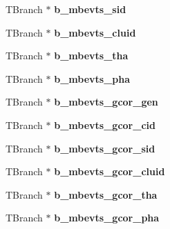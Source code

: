 \begin{DoxyCompactItemize}
\item 
\hypertarget{classg__clx_a80f356c60fe1eea5e82fcba16b4d482b}{T\-Branch $\ast$ {\bfseries b\-\_\-mbevts\-\_\-sid}}\label{classg__clx_a80f356c60fe1eea5e82fcba16b4d482b}

\item 
\hypertarget{classg__clx_ae91752a1092e7b3ec6191515378fbd63}{T\-Branch $\ast$ {\bfseries b\-\_\-mbevts\-\_\-cluid}}\label{classg__clx_ae91752a1092e7b3ec6191515378fbd63}

\item 
\hypertarget{classg__clx_a7c4dd347f0cf1856c3aaca6c77a3280a}{T\-Branch $\ast$ {\bfseries b\-\_\-mbevts\-\_\-tha}}\label{classg__clx_a7c4dd347f0cf1856c3aaca6c77a3280a}

\item 
\hypertarget{classg__clx_ae9e6b4ef1483c136f08a0bd34ff3c98a}{T\-Branch $\ast$ {\bfseries b\-\_\-mbevts\-\_\-pha}}\label{classg__clx_ae9e6b4ef1483c136f08a0bd34ff3c98a}

\item 
\hypertarget{classg__clx_a272e88232977ef4a5537d35dea2abb53}{T\-Branch $\ast$ {\bfseries b\-\_\-mbevts\-\_\-gcor\-\_\-gen}}\label{classg__clx_a272e88232977ef4a5537d35dea2abb53}

\item 
\hypertarget{classg__clx_a3fd25e2237b246bfea4505b3df5f18f6}{T\-Branch $\ast$ {\bfseries b\-\_\-mbevts\-\_\-gcor\-\_\-cid}}\label{classg__clx_a3fd25e2237b246bfea4505b3df5f18f6}

\item 
\hypertarget{classg__clx_ade7b131c7bdc5550ee4f7564a562ebbf}{T\-Branch $\ast$ {\bfseries b\-\_\-mbevts\-\_\-gcor\-\_\-sid}}\label{classg__clx_ade7b131c7bdc5550ee4f7564a562ebbf}

\item 
\hypertarget{classg__clx_ae23d5724733086d7e63dc3f69a5785ae}{T\-Branch $\ast$ {\bfseries b\-\_\-mbevts\-\_\-gcor\-\_\-cluid}}\label{classg__clx_ae23d5724733086d7e63dc3f69a5785ae}

\item 
\hypertarget{classg__clx_a014cf5b11b0198747192d29bbf506066}{T\-Branch $\ast$ {\bfseries b\-\_\-mbevts\-\_\-gcor\-\_\-tha}}\label{classg__clx_a014cf5b11b0198747192d29bbf506066}

\item 
\hypertarget{classg__clx_aba6a6fa2f721ae370bac54aae22c793e}{T\-Branch $\ast$ {\bfseries b\-\_\-mbevts\-\_\-gcor\-\_\-pha}}\label{classg__clx_aba6a6fa2f721ae370bac54aae22c793e}


\end{DoxyCompactItemize}
